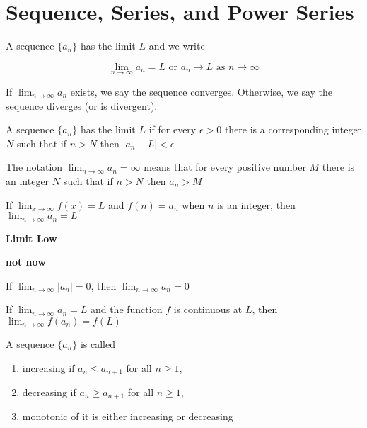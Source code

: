 \section{Sequence, Series, and Power Series}

\begin{defn}
	A sequence $\{a_n\}$ has the limit $L$ and we write 
	
	$$\lim_{n \rightarrow \infty}a_n = L \text{ or } a_n \rightarrow L \text{ as } n \rightarrow \infty$$
	
	If $\lim_{n \rightarrow \infty} a_n$ exists, we say the sequence converges. Otherwise, we say the sequence diverges (or is divergent).	
\end{defn}

\begin{defn}
	A sequence $\{a_n\}$ has the limit $L$ if for every $\epsilon > 0$ there is a corresponding integer $N$ such that if $n > N$ then $|a_n - L| <  \epsilon$
\end{defn}

\begin{defn}
The notation $\lim_{n \rightarrow \infty} a_n = \infty$ means that for every positive number $M$ there is an integer $N$ such that if $n > N$ then $a_n > M$	
\end{defn}

\begin{thm*}
	If $\lim_{x \rightarrow \infty}f(x) = L$ and $f(n) = a_n$ when $n$ is an integer, then $\lim_{n \rightarrow \infty}a_n = L$	
\end{thm*}

\textbf{Limit Low}

\textbf{\color{red} not now}

\begin{thm*}
	If $\lim_{n \rightarrow \infty}|a_n| = 0$, then $\lim_{n \rightarrow \infty}a_n = 0$	
\end{thm*}

\begin{thm*}
	If $\lim_{n \rightarrow \infty}a_n = L$ and the function $f$ is continuous at $L$, then $\lim_{n \rightarrow \infty}f(a_n) = f(L)$	
\end{thm*}

\begin{defn}
	A sequence $\{a_n\}$ is called 
	
	\begin{enumerate}
		\item increasing if $a_n \leq a_{n+1}$ for all $n \geq 1$,
		\item decreasing if $a_n \geq a_{n+1}$ for all $n \geq 1$,
		\item monotonic of it is either increasing or decreasing	
	\end{enumerate}
	
\end{defn}


